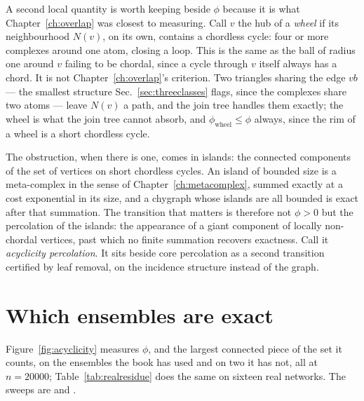 A second local quantity is worth keeping beside $\phi$ because it is what
Chapter~\ref{ch:overlap} was closest to measuring. Call $v$ the hub of a
\emph{wheel} if its neighbourhood $N(v)$, on its own, contains a chordless
cycle: four or more complexes around one atom, closing a loop. This is the
same as the ball of radius one around $v$ failing to be chordal, since a cycle
through $v$ itself always has a chord. It is not Chapter~\ref{ch:overlap}'s
criterion. Two triangles sharing the edge $vb$ --- the smallest structure
Sec.~\ref{sec:threeclasses} flags, since the complexes share two atoms ---
leave $N(v)$ a path, and the join tree handles them exactly; the wheel is what
the join tree cannot absorb, and $\phi_{\mathrm{wheel}}\le\phi$ always, since
the rim of a wheel is a short chordless cycle.

The obstruction, when there is one, comes in islands: the connected
components of the set of vertices on short chordless cycles. An island of bounded
size is a meta-complex in the sense of Chapter~\ref{ch:metacomplex}, summed
exactly at a cost exponential in its size, and a chygraph whose islands are
all bounded is exact after that summation. The transition that matters is
therefore not $\phi>0$ but the percolation of the islands: the
appearance of a giant component of locally non-chordal vertices, past which
no finite summation recovers exactness. Call it \emph{acyclicity percolation}.
It sits beside core percolation as a second transition certified by leaf
removal, on the incidence structure instead of the graph.

\section{Which ensembles are exact}
\label{sec:whichexact}

Figure~\ref{fig:acyclicity} measures $\phi$, and the largest connected piece
of the set it counts, on the ensembles the book has used and on two it has
not, all at $n=20000$; Table~\ref{tab:realresidue} does the same on sixteen
real networks. The sweeps are  and .

